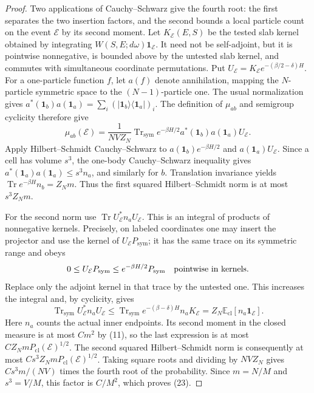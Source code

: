 \begin{proof}
Two applications of Cauchy--Schwarz give the fourth root: the first
separates the two insertion factors, and the second bounds a local
particle count on the event $\mathcal E$ by its second moment.
Let $K_{\mathcal E}(E,S)$ be the tested slab kernel obtained
by integrating $W(S,E;d\omega)\mathbf1_{\mathcal E}$.
It need not be self-adjoint, but it is pointwise nonnegative,
is bounded above by the untested slab kernel, and commutes
with simultaneous coordinate permutations. Put
$U_{\mathcal E}=K_{\mathcal E}e^{-(\beta/2-\delta)H}$.
For a one-particle function $f$, let $a(f)$ denote annihilation,
mapping the $N$-particle symmetric space to the $(N-1)$-particle
one. The usual normalization gives
$a^*(\mathbf1_b)a(\mathbf1_a)
=\sum_i(|\mathbf1_b\rangle\langle\mathbf1_a|)_i$.
The definition of $\mu_{ab}$ and semigroup cyclicity therefore give
\[
 \mu_{ab}(\mathcal E)=\frac1{NVZ_N}
 \operatorname{Tr}_{\mathrm{sym}}
 e^{-\beta H/2}a^*(\mathbf1_b)a(\mathbf1_a)U_{\mathcal E}.
\]
Apply Hilbert--Schmidt Cauchy--Schwarz to
$a(\mathbf1_b)e^{-\beta H/2}$ and
$a(\mathbf1_a)U_{\mathcal E}$. Since a cell has volume $s^3$,
the one-body Cauchy--Schwarz inequality gives
$a^*(\mathbf1_a)a(\mathbf1_a)\leq s^3n_a$, and similarly
for $b$. Translation invariance yields
$\operatorname{Tr}e^{-\beta H}n_b=Z_Nm$.
Thus the first squared Hilbert--Schmidt norm is at most
$s^3Z_Nm$.

For the second norm use
$\operatorname{Tr}U_{\mathcal E}^*n_aU_{\mathcal E}$.
This is an integral of products of nonnegative kernels.
Precisely, on labeled coordinates one may insert the projector
and use the kernel of $U_{\mathcal E}P_{\mathrm{sym}}$; it
has the same trace on its symmetric range and obeys
\[
 0\leq U_{\mathcal E}P_{\mathrm{sym}}
 \leq e^{-\beta H/2}P_{\mathrm{sym}}
 \quad\hbox{pointwise in kernels}.
\]
Replace only the adjoint kernel in that trace by the untested
one. This increases the integral and, by cyclicity, gives
\[
 \operatorname{Tr}_{\mathrm{sym}}U_{\mathcal E}^*n_aU_{\mathcal E}
 \leq\operatorname{Tr}_{\mathrm{sym}}
 e^{-(\beta-\delta)H}n_aK_{\mathcal E}
 =Z_N\mathbb E_{\mathrm{cl}}[n_a\mathbf1_{\mathcal E}].
\]
Here $n_a$ counts the actual inner endpoints. Its second
moment in the closed measure is at most $Cm^2$ by (11),
so the last expression is at most
$CZ_NmP_{\mathrm{cl}}(\mathcal E)^{1/2}$.
The second squared Hilbert--Schmidt norm is consequently at
most $Cs^3Z_NmP_{\mathrm{cl}}(\mathcal E)^{1/2}$.
Taking square roots and dividing by $NVZ_N$ gives
$Cs^3m/(NV)$ times the fourth root of the probability.
Since $m=N/M$ and $s^3=V/M$, this factor is $C/M^2$,
which proves (23).
\end{proof}
